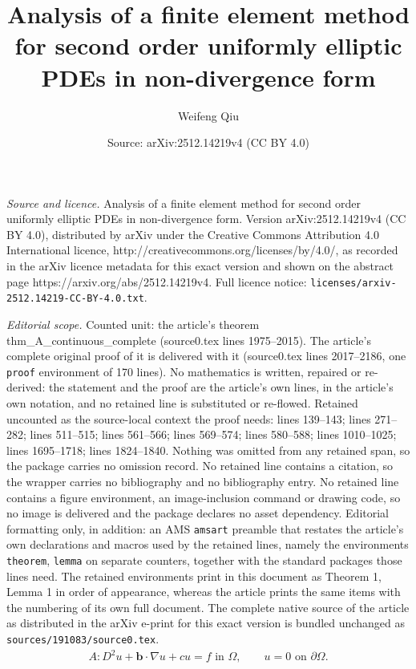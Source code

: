 \documentclass[10pt,a4paper]{amsart}
\title{Analysis of a finite element method for second order uniformly elliptic PDEs in non-divergence form}
\author{Weifeng Qiu}
\date{Source: arXiv:2512.14219v4 (CC BY 4.0)}
\begin{document}
\maketitle

\noindent\emph{Source and licence.} Analysis of a finite element method for second order uniformly elliptic PDEs in non-divergence form. Version arXiv:2512.14219v4 (CC BY 4.0), distributed by arXiv under the Creative Commons Attribution 4.0 International licence, http://creativecommons.org/licenses/by/4.0/, as recorded in the arXiv licence metadata for this exact version and shown on the abstract page https://arxiv.org/abs/2512.14219v4. Full licence notice: \texttt{licenses/arxiv-2512.14219-CC-BY-4.0.txt}.\par\smallskip

\noindent\textit{Editorial scope.} Counted unit: the article's theorem thm\_A\_continuous\_complete (source0.tex lines 1975--2015). The article's complete original proof of it is delivered with it (source0.tex lines 2017--2186, one \texttt{proof} environment of 170 lines). No mathematics is written, repaired or re-derived: the statement and the proof are the article's own lines, in the article's own notation, and no retained line is substituted or re-flowed.  Retained uncounted as the source-local context the proof needs: lines 139--143; lines 271--282; lines 511--515; lines 561--566; lines 569--574; lines 580--588; lines 1010--1025; lines 1695--1718; lines 1824--1840.  Nothing was omitted from any retained span, so the package carries no omission record.  No retained line contains a citation, so the wrapper carries no bibliography and no bibliography entry.  No retained line contains a figure environment, an image-inclusion command or drawing code, so no image is delivered and the package declares no asset dependency.  Editorial formatting only, in addition: an AMS \texttt{amsart} preamble that restates the article's own declarations and macros used by the retained lines, namely the environments \texttt{theorem}, \texttt{lemma} on separate counters, together with the standard packages those lines need.  The retained environments print in this document as Theorem 1, Lemma 1 in order of appearance, whereas the article prints the same items with the numbering of its own full document.  The complete native source of the article as distributed in the arXiv e-print for this exact version is bundled unchanged as \texttt{sources/191083/source0.tex}.
\begin{align}
\label{nondiv_pde_original}
A:D^{2}u + \boldsymbol{b}\cdot\nabla u + cu = f \text{ in } \Omega, \qquad 
u = 0 \text{ on } \partial\Omega.
\end{align}
\end{document}
